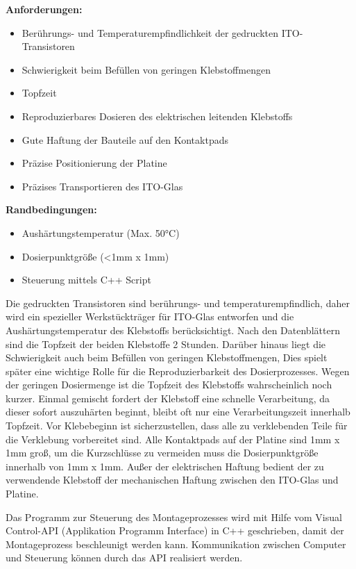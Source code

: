 {\bf Anforderungen:}
\begin{itemize}
    \item Berührungs- und Temperaturempfindlichkeit der gedruckten ITO-Transistoren
    \item Schwierigkeit beim Befüllen von geringen Klebstoffmengen
    \item Topfzeit 
    \item Reproduzierbares Dosieren des elektrischen leitenden Klebstoffs
    \item Gute Haftung der Bauteile auf den Kontaktpads 
    \item Präzise Positionierung der Platine
    \item Präzises Transportieren des ITO-Glas
\end{itemize}
{\bf Randbedingungen:}
\begin{itemize}
    \item Aushärtungstemperatur (Max. 50°C)
    \item Dosierpunktgröße (\textless 1mm x 1mm)
    \item Steuerung mittels C++ Script
\end{itemize}
Die gedruckten Transistoren sind berührungs- und temperaturempfindlich, daher wird ein spezieller Werkstückträger für ITO-Glas entworfen und die Aushärtungstemperatur des Klebstoffs berücksichtigt. Nach den Datenblättern sind die Topfzeit der beiden Klebstoffe 2 Stunden. Darüber hinaus liegt die Schwierigkeit auch beim Befüllen von geringen Klebstoffmengen, Dies spielt später eine wichtige Rolle für die Reproduzierbarkeit des Dosierprozesses. Wegen der geringen Dosiermenge ist die Topfzeit des Klebstoffs wahrscheinlich noch kurzer. Einmal gemischt fordert der Klebstoff eine schnelle Verarbeitung, da dieser sofort auszuhärten beginnt, bleibt oft nur eine Verarbeitungszeit innerhalb Topfzeit. Vor Klebebeginn ist sicherzustellen, dass alle zu verklebenden Teile für die Verklebung vorbereitet sind. Alle Kontaktpads auf der Platine sind 1mm x 1mm groß, um die Kurzschlüsse zu vermeiden muss die Dosierpunktgröße innerhalb von 1mm x 1mm. Außer der elektrischen Haftung bedient der zu verwendende Klebstoff der mechanischen Haftung zwischen den ITO-Glas und Platine. 

Das Programm zur Steuerung des Montageprozesses wird mit Hilfe vom Visual Control-API (Applikation Programm Interface) in C++ geschrieben, damit der Montageprozess beschleunigt werden kann. Kommunikation zwischen Computer und Steuerung können durch das API realisiert werden. 

